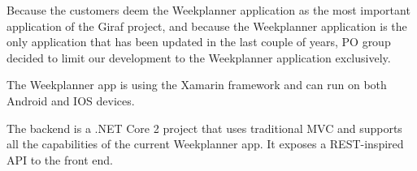 Because the customers deem the Weekplanner application as the most important application of the Giraf project, and because the Weekplanner application is the only application that has been updated in the last couple of years, \gls{PO} group decided to limit our development to the Weekplanner application exclusively.

The Weekplanner app is using the Xamarin framework and can run on both Android and IOS devices.

The backend is a .NET Core 2 project that uses traditional MVC and supports all the capabilities of the current Weekplanner app. It exposes a REST-inspired API to the front end.

